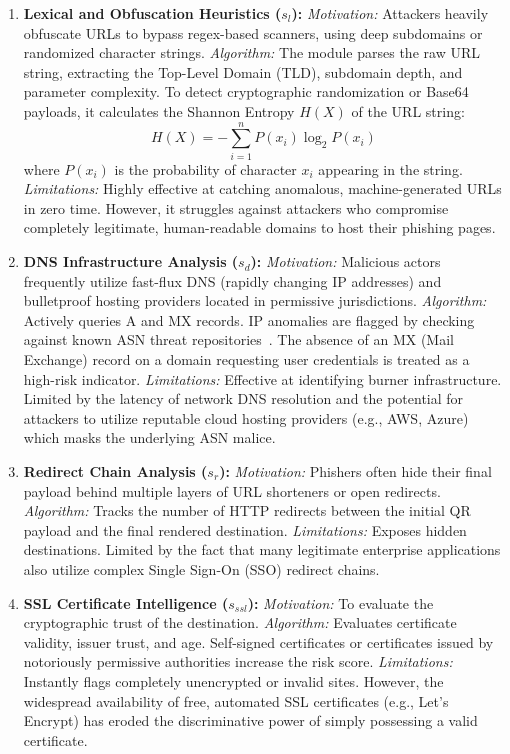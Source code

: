 \documentclass[10pt,twocolumn,letterpaper]{article}
\begin{document}
\begin{enumerate}
    \item \textbf{Lexical and Obfuscation Heuristics ($s_l$):} 
    \textit{Motivation:} Attackers heavily obfuscate URLs to bypass regex-based scanners, using deep subdomains or randomized character strings.
    \textit{Algorithm:} The module parses the raw URL string, extracting the Top-Level Domain (TLD), subdomain depth, and parameter complexity. To detect cryptographic randomization or Base64 payloads, it calculates the Shannon Entropy $H(X)$ of the URL string:
    \begin{equation}
    H(X) = - \sum_{i=1}^{n} P(x_i) \log_2 P(x_i)
    \end{equation}
    where $P(x_i)$ is the probability of character $x_i$ appearing in the string. 
    \textit{Limitations:} Highly effective at catching anomalous, machine-generated URLs in zero time. However, it struggles against attackers who compromise completely legitimate, human-readable domains to host their phishing pages.

    \item \textbf{DNS Infrastructure Analysis ($s_d$):} 
    \textit{Motivation:} Malicious actors frequently utilize fast-flux DNS (rapidly changing IP addresses) and bulletproof hosting providers located in permissive jurisdictions.
    \textit{Algorithm:} Actively queries A and MX records. IP anomalies are flagged by checking against known ASN threat repositories~\cite{Bilge2011}. The absence of an MX (Mail Exchange) record on a domain requesting user credentials is treated as a high-risk indicator.
    \textit{Limitations:} Effective at identifying burner infrastructure. Limited by the latency of network DNS resolution and the potential for attackers to utilize reputable cloud hosting providers (e.g., AWS, Azure) which masks the underlying ASN malice.

    \item \textbf{Redirect Chain Analysis ($s_r$):} 
    \textit{Motivation:} Phishers often hide their final payload behind multiple layers of URL shorteners or open redirects.
    \textit{Algorithm:} Tracks the number of HTTP redirects between the initial QR payload and the final rendered destination. 
    \textit{Limitations:} Exposes hidden destinations. Limited by the fact that many legitimate enterprise applications also utilize complex Single Sign-On (SSO) redirect chains.

    \item \textbf{SSL Certificate Intelligence ($s_{ssl}$):} 
    \textit{Motivation:} To evaluate the cryptographic trust of the destination.
    \textit{Algorithm:} Evaluates certificate validity, issuer trust, and age. Self-signed certificates or certificates issued by notoriously permissive authorities increase the risk score.
    \textit{Limitations:} Instantly flags completely unencrypted or invalid sites. However, the widespread availability of free, automated SSL certificates (e.g., Let's Encrypt) has eroded the discriminative power of simply possessing a valid certificate.


\end{enumerate}
\end{document}

